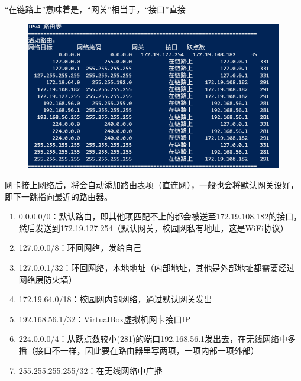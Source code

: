 \begin{example}[实战分析]
	“在链路上”意味着是，“网关”相当于，“接口”直接
	\begin{figure}[H]
		\centering
		\includegraphics[width=0.6\linewidth]{fig/my-router-table.png}
	\end{figure}
\end{example}
\begin{analysis}
	网卡接上网络后，将会自动添加路由表项（直连网），一般也会将默认网关设好，即下一跳指向最近的路由器。
	\begin{enumerate}
		\item 0.0.0.0/0：默认路由，即其他项匹配不上的都会被送至172.19.108.182的接口，\\然后发送到172.19.127.254（默认网关，校园网私有地址，这是WiFi协议）
		\item 127.0.0.0/8：环回网络，发给自己
		\item 127.0.0.1/32：环回网络，本地地址（内部地址，其他是外部地址都需要经过网络层防火墙）
		\item 172.19.64.0/18：校园网内部网络，通过默认网关发出
		\item 192.168.56.1/32：VirtualBox虚拟机网卡接口IP
		\item 224.0.0.0/4：从跃点数较小(281)的端口192.168.56.1发出去，在无线网络中多播（接口不一样，因此要在路由器里写两项，一项内部一项外部）
		\item 255.255.255.255/32：在无线网络中广播
	\end{enumerate}
\end{analysis}

